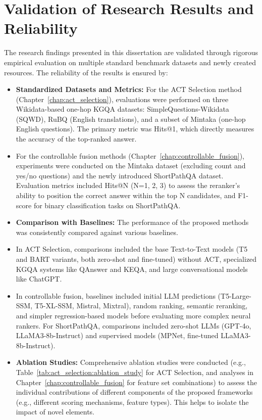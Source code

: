 \section{Validation of Research Results and Reliability}
\label{sec:intro:validation}
The research findings presented in this dissertation are validated through rigorous empirical evaluation on multiple standard benchmark datasets and newly created resources. The reliability of the results is ensured by:
\begin{itemize}
    \item \textbf{Standardized Datasets and Metrics:} For the ACT Selection method (Chapter~\ref{chap:act_selection}), evaluations were performed on three Wikidata-based one-hop KGQA datasets: SimpleQuestions-Wikidata (SQWD), RuBQ (English translations), and a subset of Mintaka (one-hop English questions). The primary metric was Hits@1, which directly measures the accuracy of the top-ranked answer.
    \item For the controllable fusion methods (Chapter~\ref{chap:controllable_fusion}), experiments were conducted on the Mintaka dataset (excluding count and yes/no questions) and the newly introduced ShortPathQA dataset. Evaluation metrics included Hits@N (N=1, 2, 3) to assess the reranker's ability to position the correct answer within the top N candidates, and F1-score for binary classification tasks on ShortPathQA.
    \item \textbf{Comparison with Baselines:} The performance of the proposed methods was consistently compared against various baselines.
        \item In ACT Selection, comparisons included the base Text-to-Text models (T5 and BART variants, both zero-shot and fine-tuned) without ACT, specialized KGQA systems like QAnswer and KEQA, and large conversational models like ChatGPT.
        \item In controllable fusion, baselines included initial LLM predictions (T5-Large-SSM, T5-XL-SSM, Mistral, Mixtral), random ranking, semantic reranking, and simpler regression-based models before evaluating more complex neural rankers. For ShortPathQA, comparisons included zero-shot LLMs (GPT-4o, LLaMA3-8b-Instruct) and supervised models (MPNet, fine-tuned LLaMA3-8b-Instruct).
    \item \textbf{Ablation Studies:} Comprehensive ablation studies were conducted (e.g., Table~\ref{tab:act_selection:ablation_study} for ACT Selection, and analyses in Chapter~\ref{chap:controllable_fusion} for feature set combinations) to assess the individual contributions of different components of the proposed frameworks (e.g., different scoring mechanisms, feature types). This helps to isolate the impact of novel elements.

\end{itemize}
